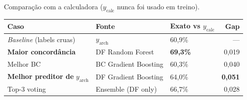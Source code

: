 \documentclass[aspectratio=149, dvipsnames]{beamer}
\begin{document}
\begin{frame}{Comparação com a calculadora ($y_{\text{calc}}$ nunca foi usado em treino).}\pause
    \footnotesize
    \begin{center}
        \begin{tabular}{lllr}
            \toprule
            Caso & Fonte & Exato vs $y_{\text{calc}}$ & Gap \\
            \midrule
            \textit{Baseline} (labels cruas) & $y_{\text{arch}}$ & 60{,}9\% & --- \\
            \textbf{Maior concordância} & DF Random Forest & \textbf{69{,}3\%} & 0{,}019 \\
            Melhor BC & BC Gradient Boosting & 60{,}3\% & 0{,}040 \\
            \textbf{Melhor preditor de} $y_{\text{arch}}$ & DF Gradient Boosting & 64{,}0\% & \textbf{0{,}051} \\
            Top-3 voting & Ensemble (DF only) & 66{,}7\% & 0{,}028 \\
            \bottomrule
        \end{tabular}
    \end{center}
    \normalsize
    \vfill
    \medskip

\end{frame}
\end{document}
